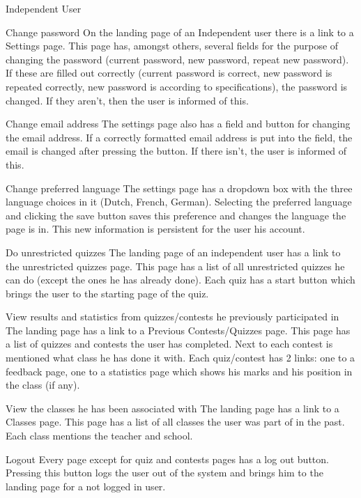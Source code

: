 \begin{section}{Independent User}

    \begin{subsection}{Change password}
		\label{indep-pass}
		On the landing page of an Independent user there is a link to a Settings page. This page has, amongst others, several fields for the purpose of changing the password (current password, new password, repeat new password). If these are filled out correctly (current password is correct, new password is repeated correctly, new password is according to specifications), the password is changed. If they aren't, then the user is informed of this.
    \end{subsection}
    \begin{subsection}{Change email address}
    	\label{indep-email}
    	The settings page also has a field and button for changing the email address. If a correctly formatted email address is put into the field, the email is changed after pressing the button. If there isn't, the user is informed of this.
    \end{subsection}
    \begin{subsection}{Change preferred language}
    The settings page has a dropdown box with the three language choices in it (Dutch, French, German). Selecting the preferred language and clicking the save button saves this preference and changes the language the page is in. This new information is persistent for the user his account.
    	\label{indep-lang}
    \end{subsection}
    \begin{subsection}{Do unrestricted quizzes}
    	\label{indep-unrest}
    	The landing page of an independent user has a link to the unrestricted quizzes page. This page has a list of all unrestricted quizzes he can do (except the ones he has already done). Each quiz has a start button which brings the user to the starting page of the quiz.
    \end{subsection}
    \begin{subsection}{View results and statistics from quizzes/contests he previously participated in}
    	\label{indep-resstat}
    	The landing page has a link to a Previous Contests/Quizzes page. This page has a list of quizzes and contests the user has completed. Next to each contest is mentioned what class he has done it with. Each quiz/contest has 2 links: one to a feedback page, one to a statistics page which shows his marks and his position in the class (if any).
    \end{subsection}
    \begin{subsection}{View the classes he has been associated with}
    The landing page has a link to a Classes page. This page has a list of all classes the user was part of in the past. Each class mentions the teacher and school.
    	\label{indep-class}
    \end{subsection}
    \begin{subsection}{Logout}
    	\label{indep-logout}
    	Every page except for quiz and contests pages has a log out button. Pressing this button logs the user out of the system and brings him to the landing page for a not logged in user.
    \end{subsection}
    

\end{section}
